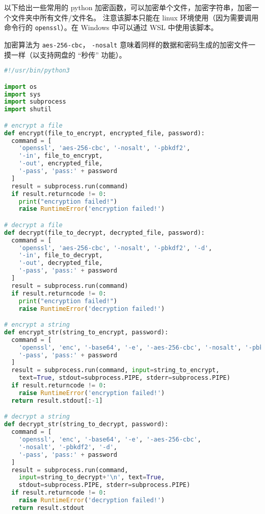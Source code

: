 

以下给出一些常用的 python 加密函数，可以加密单个文件，加密字符串，加密一个文件夹中所有文件/文件名。 注意该脚本只能在 linux 环境使用（因为需要调用命令行的 \verb`openssl`）。在 Windows 中可以通过 WSL 中使用该脚本。

加密算法为 \verb`aes-256-cbc`， \verb`-nosalt` 意味着同样的数据和密码生成的加密文件一摸一样（以支持网盘的 “秒传” 功能）。

\begin{lstlisting}[language=python]
#!/usr/bin/python3

import os
import sys
import subprocess
import shutil

# encrypt a file
def encrypt(file_to_encrypt, encrypted_file, password):
  command = [
    'openssl', 'aes-256-cbc', '-nosalt', '-pbkdf2',
    '-in', file_to_encrypt,
    '-out', encrypted_file,
    '-pass', 'pass:' + password
  ]
  result = subprocess.run(command)
  if result.returncode != 0:
    print("encryption failed!")
    raise RuntimeError('encryption failed!')

# decrypt a file
def decrypt(file_to_decrypt, decrypted_file, password):
  command = [
    'openssl', 'aes-256-cbc', '-nosalt', '-pbkdf2', '-d',
    '-in', file_to_decrypt,
    '-out', decrypted_file,
    '-pass', 'pass:' + password
  ]
  result = subprocess.run(command)
  if result.returncode != 0:
    print("encryption failed!")
    raise RuntimeError('decryption failed!')

# encrypt a string
def encrypt_str(string_to_encrypt, password):
  command = [
    'openssl', 'enc', '-base64', '-e', '-aes-256-cbc', '-nosalt', '-pbkdf2',
    '-pass', 'pass:' + password
  ]
  result = subprocess.run(command, input=string_to_encrypt,
    text=True, stdout=subprocess.PIPE, stderr=subprocess.PIPE)
  if result.returncode != 0:
    raise RuntimeError('encryption failed!')
  return result.stdout[:-1]

# decrypt a string
def decrypt_str(string_to_decrypt, password):
  command = [
    'openssl', 'enc', '-base64', '-e', '-aes-256-cbc',
    '-nosalt', '-pbkdf2', '-d',
    '-pass', 'pass:' + password
  ]
  result = subprocess.run(command,
    input=string_to_decrypt+'\n', text=True,
    stdout=subprocess.PIPE, stderr=subprocess.PIPE)
  if result.returncode != 0:
    raise RuntimeError('decryption failed!')
  return result.stdout


\end{lstlisting}
